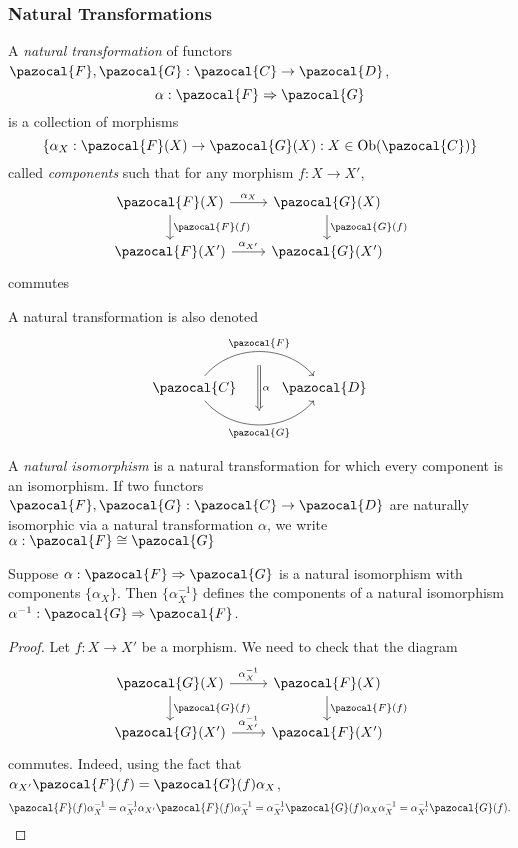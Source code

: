 \subsubsection{Natural Transformations}
\begin{definition}
    A \emph{natural transformation} of functors $\pazocal{F},\pazocal{G} : \pazocal{C}\rightarrow \pazocal{D}$,
    $$\alpha : \pazocal{F} \Rightarrow \pazocal{G}$$
    is a collection of morphisms 
    $$\left\{\alpha_X : \pazocal{F}(X)\rightarrow \pazocal{G}(X) : X\in\Ob(\pazocal{C})\right\} $$
    called \emph{components} such that for any morphism $f: X\rightarrow X'$,
    $$
        \begin{tikzcd}
            \pazocal{F}(X) \arrow[r, "\alpha_X"] \arrow[d,"\pazocal{F}(f)"] & \pazocal{G}(X)\arrow[d,"\pazocal{G}(f)"]\\
            \pazocal{F}(X') \arrow[r,"\alpha_{X'}"] & \pazocal{G}(X')
        \end{tikzcd}
    $$ 
    commutes
\end{definition}
\begin{remark}
    A natural transformation is also denoted 
    $$
        \begin{tikzcd}
            \pazocal{C} \arrow[r,bend left = 50, "\pazocal{F}"{name=F}] \arrow[r, bend right = 50, "\pazocal{G}"{name=G},swap] & \pazocal{D}  \arrow[Rightarrow,from=F, to=G,"\alpha", shorten <= 10pt, shorten >= 10 pt]
        \end{tikzcd}
    $$
\end{remark}
\begin{definition}
    A \emph{natural isomorphism} is a natural transformation for which every component is an isomorphism. If two functors $\pazocal{F},\pazocal{G}: \pazocal{C}\rightarrow \pazocal{D}$ are naturally isomorphic via a natural transformation $\alpha$, we write $\alpha: \pazocal{F}\cong \pazocal{G}$ 
\end{definition}
\begin{lemma}
    Suppose $\alpha : \pazocal{F}\Rightarrow \pazocal{G}$ is a natural isomorphism with components $\{\alpha_X\}$. Then $\{\alpha_X^{-1}\}$ defines the components of a natural isomorphism $\alpha^{-1} : \pazocal{G} \Rightarrow \pazocal{F}$. 
\end{lemma}
\begin{proof}
    Let $f: X\rightarrow X'$ be a morphism. We need to check that the diagram 
    $$
        \begin{tikzcd}
            \pazocal{G}(X) \arrow[r,"\alpha_X^{-1}"] \arrow[d,"\pazocal{G}(f)"] & \pazocal{F}(X)\arrow[d,"\pazocal{F}(f)"] \\
            \pazocal{G}(X')\arrow[r,"\alpha_{X'}^{-1}"] & \pazocal{F}(X')
        \end{tikzcd}
    $$
    commutes. Indeed, using the fact that $\alpha_{X'}\pazocal{F}(f)= \pazocal{G}(f)\alpha_X$,
    \begin{align*}
        \pazocal{F}(f)\alpha_{X}^{-1} = \alpha_{X'}^{-1}\alpha_{X'}\pazocal{F}(f)\alpha_X^{-1} = \alpha_{X'}^{-1}\pazocal{G}(f)\alpha_X\alpha_X^{-1}= \alpha_{X'}^{-1}\pazocal{G}(f).
    \end{align*}
\end{proof}
